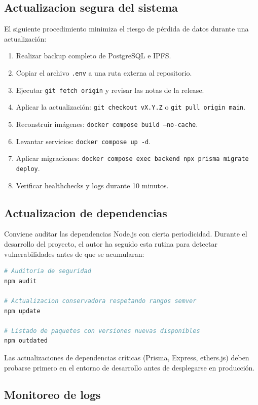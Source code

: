 \documentclass[11pt, a4paper]{article}
\begin{document}
\subsection{Actualizacion segura del sistema}

El siguiente procedimiento minimiza el riesgo de p\'{e}rdida de datos durante una actualizaci\'{o}n:

\begin{enumerate}[leftmargin=*]
    \item Realizar backup completo de PostgreSQL e IPFS.
    \item Copiar el archivo \texttt{.env} a una ruta externa al repositorio.
    \item Ejecutar \texttt{git fetch origin} y revisar las notas de la release.
    \item Aplicar la actualizaci\'{o}n: \texttt{git checkout vX.Y.Z} o \texttt{git pull origin main}.
    \item Reconstruir im\'{a}genes: \texttt{docker compose build --no-cache}.
    \item Levantar servicios: \texttt{docker compose up -d}.
    \item Aplicar migraciones: \texttt{docker compose exec backend npx prisma migrate deploy}.
    \item Verificar healthchecks y logs durante 10 minutos.
\end{enumerate}

\subsection{Actualizacion de dependencias}

Conviene auditar las dependencias Node.js con cierta periodicidad. Durante el desarrollo del proyecto, el autor ha seguido esta rutina para detectar vulnerabilidades antes de que se acumularan:

\begin{lstlisting}[language=bash]
# Auditoria de seguridad
npm audit

# Actualizacion conservadora respetando rangos semver
npm update

# Listado de paquetes con versiones nuevas disponibles
npm outdated
\end{lstlisting}

Las actualizaciones de dependencias cr\'{i}ticas (Prisma, Express, ethers.js) deben probarse primero en el entorno de desarrollo antes de desplegarse en producci\'{o}n.

\subsection{Monitoreo de logs}
\end{document}
